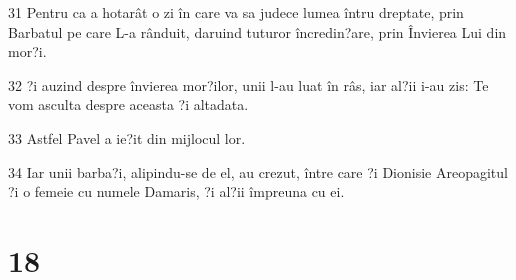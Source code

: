 \par 31 Pentru ca a hotarât o zi în care va sa judece lumea întru dreptate, prin Barbatul pe care L-a rânduit, daruind tuturor încredin?are, prin Învierea Lui din mor?i.
\par 32 ?i auzind despre învierea mor?ilor, unii l-au luat în râs, iar al?ii i-au zis: Te vom asculta despre aceasta ?i altadata.
\par 33 Astfel Pavel a ie?it din mijlocul lor.
\par 34 Iar unii barba?i, alipindu-se de el, au crezut, între care ?i Dionisie Areopagitul ?i o femeie cu numele Damaris, ?i al?ii împreuna cu ei.

\chapter{18}

